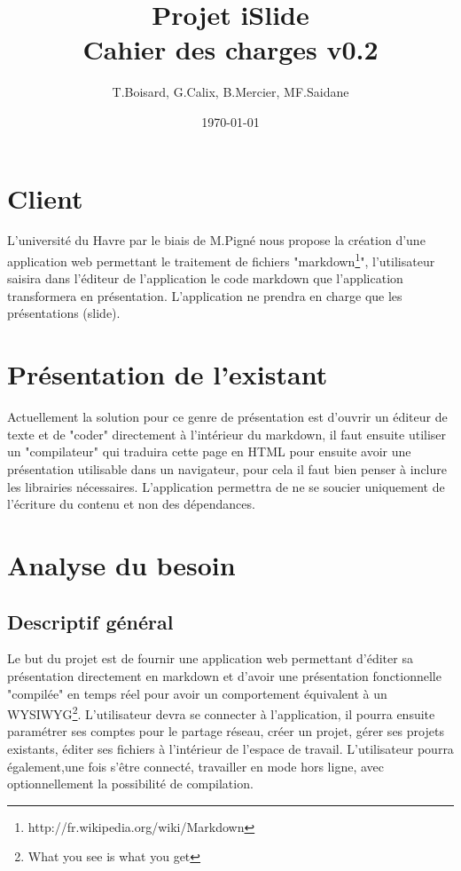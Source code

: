 \documentclass[11pt,a4paper,svgnames]{article}
\begin{document}
\author{T.Boisard, G.Calix, B.Mercier, MF.Saidane}
\date{\today}
\title{Projet iSlide\\Cahier des charges v0.2}




\tableofcontents
\newpage

\section{Client}
L'université du Havre par le biais de M.Pigné nous propose la création d'une application web permettant le traitement de fichiers "markdown\footnote{http://fr.wikipedia.org/wiki/Markdown}", l'utilisateur saisira dans l'éditeur de l'application le code markdown que l'application transformera en présentation. L'application ne prendra en charge que les présentations (slide).

\section{Présentation de l'existant}

Actuellement la solution pour ce genre de présentation est d'ouvrir un éditeur de texte et de "coder" directement à l'intérieur du markdown, il faut ensuite utiliser un "compilateur" qui traduira cette page en HTML pour ensuite avoir une présentation utilisable dans un navigateur, pour cela il faut bien penser à inclure les librairies nécessaires. L'application permettra de ne se soucier uniquement de l'écriture du contenu et non des dépendances.

\section{Analyse du besoin}

\subsection{Descriptif général}
Le but du projet est de fournir une application web permettant d'éditer sa présentation directement en markdown et d'avoir une présentation fonctionnelle "compilée" en temps réel pour avoir un comportement équivalent à un WYSIWYG\footnote{What you see is what you get}. L'utilisateur devra se connecter à l'application, il pourra ensuite paramétrer ses comptes pour le partage réseau, créer un projet, gérer ses projets existants, éditer ses fichiers à l'intérieur de l'espace de travail.
L'utilisateur pourra également,une fois s'être connecté, travailler en mode hors ligne, avec optionnellement la possibilité de compilation.
\end{document}
